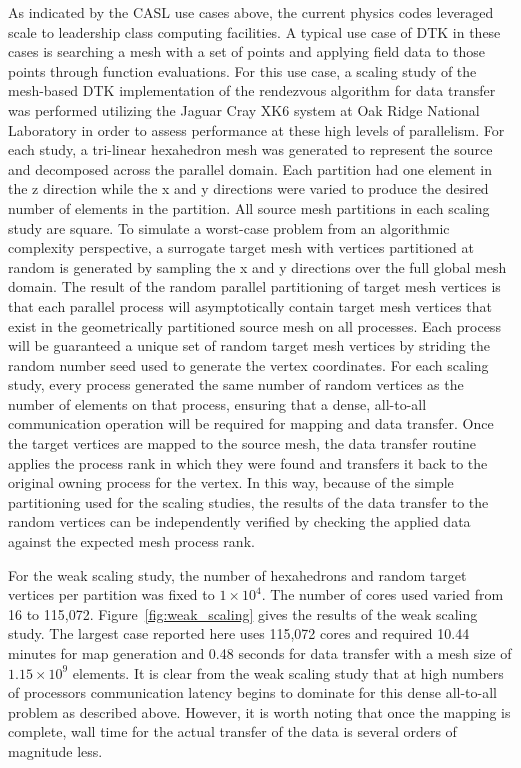 \documentclass{mc2013}
\begin{document}
\label{sec:scaling_study}

As indicated by the CASL use cases above, the current physics codes
leveraged scale to leadership class computing facilities. A typical
use case of DTK in these cases is searching a mesh with a set of
points and applying field data to those points through function
evaluations. For this use case, a scaling study of the mesh-based DTK
implementation of the rendezvous algorithm for data transfer was
performed utilizing the Jaguar Cray XK6 system at Oak Ridge National
Laboratory in order to assess performance at these high levels of
parallelism. For each study, a tri-linear hexahedron mesh was
generated to represent the source and decomposed across the parallel
domain. Each partition had one element in the z direction while the x
and y directions were varied to produce the desired number of elements
in the partition. All source mesh partitions in each scaling study are
square.  To simulate a worst-case problem from an algorithmic
complexity perspective, a surrogate target mesh with vertices
partitioned at random is generated by sampling the x and y directions
over the full global mesh domain. The result of the random parallel
partitioning of target mesh vertices is that each parallel process
will asymptotically contain target mesh vertices that exist in the
geometrically partitioned source mesh on all processes. Each process
will be guaranteed a unique set of random target mesh vertices by
striding the random number seed used to generate the vertex
coordinates. For each scaling study, every process generated the same
number of random vertices as the number of elements on that process,
ensuring that a dense, all-to-all communication operation will be
required for mapping and data transfer. Once the target vertices are
mapped to the source mesh, the data transfer routine applies the
process rank in which they were found and transfers it back to the
original owning process for the vertex. In this way, because of the
simple partitioning used for the scaling studies, the results of the
data transfer to the random vertices can be independently verified by
checking the applied data against the expected mesh process rank.

\label{subsec:weak_scaling}
For the weak scaling study, the number of hexahedrons and random
target vertices per partition was fixed to $1 \times 10^4$. The
number of cores used varied from 16 to
115,072. Figure~\ref{fig:weak_scaling} gives the results of the weak
scaling study. The largest case reported here uses 115,072 cores and
required 10.44 minutes for map generation and 0.48 seconds for data
transfer with a mesh size of $1.15 \times 10^9$ elements. It is clear
from the weak scaling study that at high numbers of processors
communication latency begins to dominate for this dense all-to-all
problem as described above. However, it is worth noting that once the
mapping is complete, wall time for the actual transfer of the data is
several orders of magnitude less.
\end{document}
